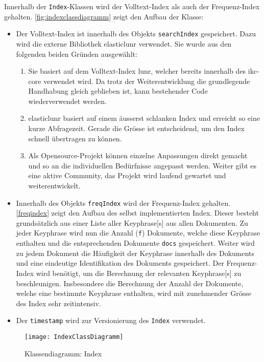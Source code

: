 Innerhalb der \texttt{Index}-Klassen wird der Volltext-Index als auch der Frequenz-Index gehalten. \autoref{fig:indexclassdiagramm} zeigt den Aufbau der Klasse:
\begin{itemize}
  \item Der Volltext-Index ist innerhalb des Objekts \texttt{searchIndex} gespeichert. Dazu wird die externe Bibliothek \gls{elasticlunr} verwendet. Sie wurde aus den folgenden beiden Gründen ausgewählt:
  \begin{enumerate}
       \item Sie basiert auf dem Volltext-Index \gls{lunr}, welcher bereits innerhalb des \gls{ikc-core} verwendet wird. Da trotz der Weiterentwicklung die grundlegende Handhabung gleich geblieben ist, kann bestehender Code wiederverwendet werden.
       \item \gls{elasticlunr} basiert auf einem äusserst schlanken Index und erreicht so eine kurze Abfragezeit. Gerade die Grösse ist entscheidend, um den Index schnell übertragen zu können.
       \item Als Opensource-Projekt können einzelne Anpassungen direkt gemacht und so an die individuellen Bedürfnisse angepasst werden. Weiter gibt es eine aktive Community, das Projekt wird laufend gewartet und weiterentwickelt.
  \end{enumerate}
  \item Innerhalb des Objekts \texttt{freqIndex} wird der Frequenz-Index gehalten. \autoref{freqindex} zeigt den Aufbau des selbst implementierten Index. Dieser besteht grundsätzlich aus einer Liste aller \gls{Keyphrase}[s] aus allen Dokumenten. Zu jeder \gls{Keyphrase} wird nun die Anzahl (\texttt{f}) Dokumente, welche diese \gls{Keyphrase} enthalten und die entsprechenden Dokumente \texttt{docs} gespeichert. Weiter wird zu jedem Dokument die Häufigkeit der \gls{Keyphrase} innerhalb des Dokuments und eine eindeutige Identifikation des Dokuments gespeichert. Der Frequenz-Index wird benötigt, um die Berechnung der relevanten \gls{Keyphrase}[s] zu beschleunigen. Insbesondere die Berechnung der Anzahl der Dokumente, welche eine bestimmte \gls{Keyphrase} enthalten, wird mit zunehmender Grösse des Index sehr zeitintensiv. 
  \item Der \texttt{timestamp} wird zur Versionierung des \texttt{Index} verwendet.
\end{itemize}


    \begin{figure}[H]
    \centering
    \texttt{[image: IndexClassDiagramm]}
    \caption{Klassendiagramm: Index}
    \label{fig:indexclassdiagramm}
    \end{figure}
    
